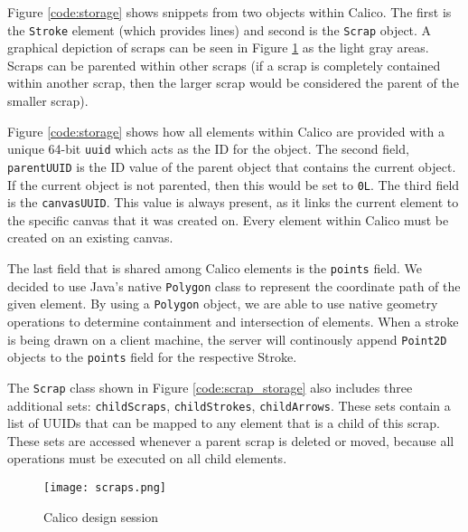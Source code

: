 Figure \ref{code:storage} shows snippets from two objects within Calico. The first is the \texttt{Stroke} element (which provides lines) and second is the \texttt{Scrap} object. A graphical depiction of scraps can be seen in Figure \ref{fig:scraps_storage} as the light gray areas. Scraps can be parented within other scraps (if a scrap is completely contained within another scrap, then the larger scrap would be considered the parent of the smaller scrap).

Figure \ref{code:storage} shows how all elements within Calico are provided with a unique 64-bit \texttt{uuid} which acts as the ID for the object. The second field, \texttt{parentUUID} is the ID value of the parent object that contains the current object. If the current object is not parented, then this would be set to \texttt{0L}. The third field is the \texttt{canvasUUID}. This value is always present, as it links the current element to the specific canvas that it was created on. Every element within Calico must be created on an existing canvas. 

The last field that is shared among Calico elements is the \texttt{points} field. We decided to use Java's native \texttt{Polygon} class to represent the coordinate path of the given element. By using a \texttt{Polygon} object, we are able to use native geometry operations to determine containment and intersection of elements. When a stroke is being drawn on a client machine, the server will continously append \texttt{Point2D} objects to the \texttt{points} field for the respective Stroke. 

The \texttt{Scrap} class shown in Figure \ref{code:scrap_storage} also includes three additional sets: \texttt{childScraps}, \texttt{childStrokes}, \texttt{childArrows}. These sets contain a list of UUIDs that can be mapped to any element that is a child of this scrap. These sets are accessed whenever a parent scrap is deleted or moved, because all operations must be executed on all child elements.


\begin{figure}[h!]
  \centering
  \texttt{[image: scraps.png]}
  \caption{Calico design session}
  \label{fig:scraps_storage}
\end{figure}

